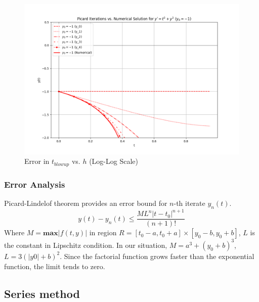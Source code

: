 \documentclass{article}
\begin{document}
\begin{figure}[htbp]
\begin{minipage}[b]{0.25\textwidth}
        \centering
        \includegraphics[width=\textwidth]{pic/Picard_-1.png}
        \caption{Error in $t_{blowup}$ vs. $h$ (Log-Log Scale) }
        \label{fig:picard_-1}
    \end{minipage}
\end{figure}

\subsubsection{Error Analysis}
Picard-Lindelof theorem provides an error bound for $n$-th iterate $y_n(t)$. 
$$y(t)-y_n(t) \leq \frac{ML^n |t-t_0|^{n+1}}{(n+1)!}$$
Where $M=\textbf{max}|f(t,y)|$ in region $R=[t_0-a, t_0 +a] \times [y_0-b, y_0+b]$, $L$ is the constant in Lipschitz condition. In our situation, $M = a^3 + (y_0+b)^3$, $L = 3(|y0|+b)^2$. Since the factorial function grows faster than the exponential function, the limit tends to zero. 



\subsection{Series method}
\end{document}
